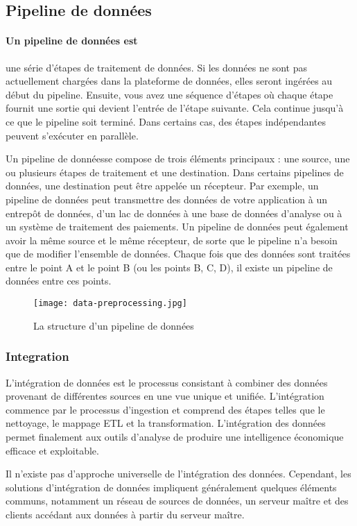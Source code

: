     \subsection{Pipeline de données}
    \paragraph*{Un pipeline de données est} une série d'étapes de traitement de données. Si les données ne sont pas actuellement chargées dans la plateforme de données, elles seront ingérées au début du pipeline. Ensuite, vous avez une séquence d'étapes où chaque étape fournit une sortie qui devient l'entrée de l'étape suivante. Cela continue jusqu'à ce que le pipeline soit terminé. Dans certains cas, des étapes indépendantes peuvent s'exécuter en parallèle.  
    
    Un pipeline de donnéesse compose de trois éléments principaux : une source, une ou plusieurs étapes de traitement et une destination. Dans certains pipelines de données, une destination peut être appelée un récepteur. Par exemple, un pipeline de données peut transmettre des données de votre application à un entrepôt de données, d'un lac de données à une base de données d'analyse ou à un système de traitement des paiements. Un pipeline de données peut également avoir la même source et le même récepteur, de sorte que le pipeline n'a besoin que de modifier l'ensemble de données. Chaque fois que des données sont traitées entre le point A et le point B (ou les points B, C, D), il existe un pipeline de données entre ces points.
    \begin{figure}[H]
        \centering
        \texttt{[image: data-preprocessing.jpg]}
        \caption{La structure d'un pipeline de données}\label{fig:data_preprocessing}
    \end{figure}
        \subsubsection{Integration}
        L'intégration de données est le processus consistant à combiner des données provenant de différentes sources en une vue unique et unifiée. L'intégration commence par le processus d'ingestion et comprend des étapes telles que le nettoyage, le mappage ETL et la transformation. L'intégration des données permet finalement aux outils d'analyse de produire une intelligence économique efficace et exploitable.

        Il n'existe pas d'approche universelle de l'intégration des données. Cependant, les solutions d'intégration de données impliquent généralement quelques éléments communs, notamment un réseau de sources de données, un serveur maître et des clients accédant aux données à partir du serveur maître.

